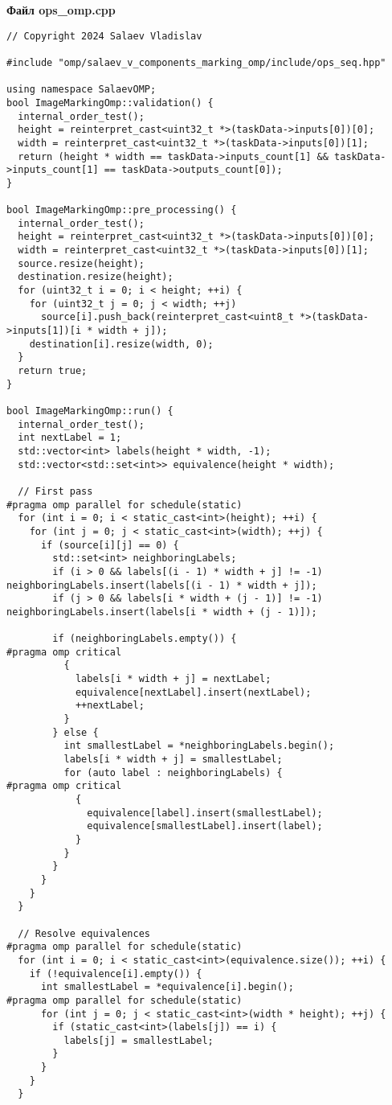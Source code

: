 \documentclass[a4paper, 14pt]{article}
\begin{document}
	\textbf{Файл ops\_omp.cpp}
	\begin{verbatim}
// Copyright 2024 Salaev Vladislav
            
#include "omp/salaev_v_components_marking_omp/include/ops_seq.hpp"
            
using namespace SalaevOMP;
bool ImageMarkingOmp::validation() {
  internal_order_test();
  height = reinterpret_cast<uint32_t *>(taskData->inputs[0])[0];
  width = reinterpret_cast<uint32_t *>(taskData->inputs[0])[1];
  return (height * width == taskData->inputs_count[1] && taskData->inputs_count[1] == taskData->outputs_count[0]);
}

bool ImageMarkingOmp::pre_processing() {
  internal_order_test();
  height = reinterpret_cast<uint32_t *>(taskData->inputs[0])[0];
  width = reinterpret_cast<uint32_t *>(taskData->inputs[0])[1];
  source.resize(height);
  destination.resize(height);
  for (uint32_t i = 0; i < height; ++i) {
    for (uint32_t j = 0; j < width; ++j)
      source[i].push_back(reinterpret_cast<uint8_t *>(taskData->inputs[1])[i * width + j]);
    destination[i].resize(width, 0);
  }
  return true;
}

bool ImageMarkingOmp::run() {
  internal_order_test();
  int nextLabel = 1;
  std::vector<int> labels(height * width, -1);
  std::vector<std::set<int>> equivalence(height * width);

  // First pass
#pragma omp parallel for schedule(static)
  for (int i = 0; i < static_cast<int>(height); ++i) {
    for (int j = 0; j < static_cast<int>(width); ++j) {
      if (source[i][j] == 0) {
        std::set<int> neighboringLabels;
        if (i > 0 && labels[(i - 1) * width + j] != -1) neighboringLabels.insert(labels[(i - 1) * width + j]);
        if (j > 0 && labels[i * width + (j - 1)] != -1) neighboringLabels.insert(labels[i * width + (j - 1)]);

        if (neighboringLabels.empty()) {
#pragma omp critical
          {
            labels[i * width + j] = nextLabel;
            equivalence[nextLabel].insert(nextLabel);
            ++nextLabel;
          }
        } else {
          int smallestLabel = *neighboringLabels.begin();
          labels[i * width + j] = smallestLabel;
          for (auto label : neighboringLabels) {
#pragma omp critical
            {
              equivalence[label].insert(smallestLabel);
              equivalence[smallestLabel].insert(label);
            }
          }
        }
      }
    }
  }

  // Resolve equivalences
#pragma omp parallel for schedule(static)
  for (int i = 0; i < static_cast<int>(equivalence.size()); ++i) {
    if (!equivalence[i].empty()) {
      int smallestLabel = *equivalence[i].begin();
#pragma omp parallel for schedule(static)
      for (int j = 0; j < static_cast<int>(width * height); ++j) {
        if (static_cast<int>(labels[j]) == i) {
          labels[j] = smallestLabel;
        }
      }
    }
  }


\end{verbatim}
\end{document}

